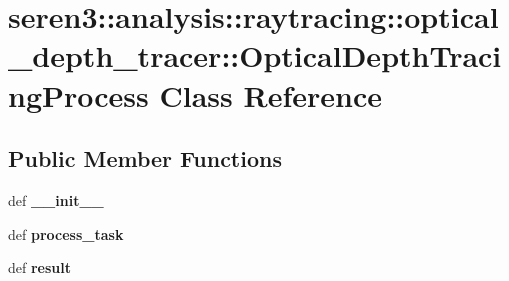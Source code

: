 \hypertarget{classseren3_1_1analysis_1_1raytracing_1_1optical__depth__tracer_1_1OpticalDepthTracingProcess}{
\section{seren3::analysis::raytracing::optical\_\-depth\_\-tracer::OpticalDepthTracingProcess Class Reference}
\label{classseren3_1_1analysis_1_1raytracing_1_1optical__depth__tracer_1_1OpticalDepthTracingProcess}
}
\subsection*{Public Member Functions}
\begin{DoxyCompactItemize}
\item 
\hypertarget{classseren3_1_1analysis_1_1raytracing_1_1optical__depth__tracer_1_1OpticalDepthTracingProcess_a8fb08b2bc9e580800f59a43265729242}{
def {\bfseries \_\-\_\-init\_\-\_\-}}
\label{classseren3_1_1analysis_1_1raytracing_1_1optical__depth__tracer_1_1OpticalDepthTracingProcess_a8fb08b2bc9e580800f59a43265729242}

\item 
\hypertarget{classseren3_1_1analysis_1_1raytracing_1_1optical__depth__tracer_1_1OpticalDepthTracingProcess_a124a5042cca7655da2c55b924abc0919}{
def {\bfseries process\_\-task}}
\label{classseren3_1_1analysis_1_1raytracing_1_1optical__depth__tracer_1_1OpticalDepthTracingProcess_a124a5042cca7655da2c55b924abc0919}

\item 
\hypertarget{classseren3_1_1analysis_1_1raytracing_1_1optical__depth__tracer_1_1OpticalDepthTracingProcess_a28aa118edf9be7f9b123ae5595e35d5d}{
def {\bfseries result}}
\label{classseren3_1_1analysis_1_1raytracing_1_1optical__depth__tracer_1_1OpticalDepthTracingProcess_a28aa118edf9be7f9b123ae5595e35d5d}

\end{DoxyCompactItemize}
